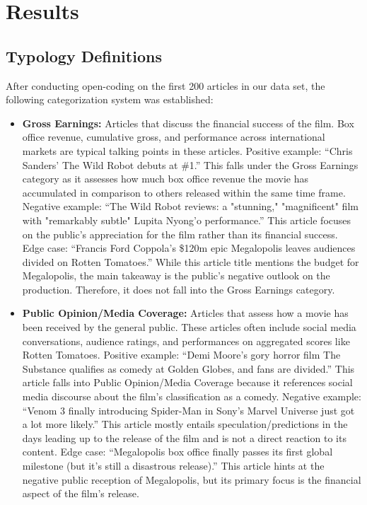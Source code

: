 \documentclass[letterpaper]{article} %
\begin{document}
\section{Results}
\subsection{Typology Definitions}

After conducting open-coding on the first 200 articles in our data set, the following categorization system was established:

\begin{itemize}
    \item \textbf{Gross Earnings:}  
    Articles that discuss the financial success of the film. Box office revenue, cumulative gross, and performance across international markets are typical talking points in these articles.  
    Positive example: “Chris Sanders’ The Wild Robot debuts at \#1.” This falls under the Gross Earnings category as it assesses how much box office revenue the movie has accumulated in comparison to others released within the same time frame.  
    Negative example: “The Wild Robot reviews: a "stunning," "magnificent" film with "remarkably subtle" Lupita Nyong’o performance.” This article focuses on the public’s appreciation for the film rather than its financial success.  
    Edge case: “Francis Ford Coppola’s \$120m epic Megalopolis leaves audiences divided on Rotten Tomatoes.” While this article title mentions the budget for Megalopolis, the main takeaway is the public’s negative outlook on the production. Therefore, it does not fall into the Gross Earnings category.  

    \item \textbf{Public Opinion/Media Coverage:}  
    Articles that assess how a movie has been received by the general public. These articles often include social media conversations, audience ratings, and performances on aggregated scores like Rotten Tomatoes.  
    Positive example: “Demi Moore’s gory horror film The Substance qualifies as comedy at Golden Globes, and fans are divided.” This article falls into Public Opinion/Media Coverage because it references social media discourse about the film’s classification as a comedy.  
    Negative example: “Venom 3 finally introducing Spider-Man in Sony’s Marvel Universe just got a lot more likely.” This article mostly entails speculation/predictions in the days leading up to the release of the film and is not a direct reaction to its content.  
    Edge case: “Megalopolis box office finally passes its first global milestone (but it’s still a disastrous release).” This article hints at the negative public reception of Megalopolis, but its primary focus is the financial aspect of the film’s release.  


\end{itemize}
\end{document}
